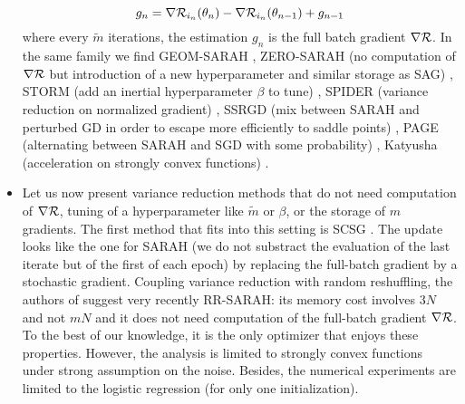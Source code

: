 \begin{itemize}
\begin{equation*}
	g_n = \nabla \mathcal{R}_{i_n}(\theta_n)-\nabla \mathcal{R}_{i_n}(\theta_{n-1})+g_{n-1}
\end{equation*}
where every $\tilde{m}$ iterations, the estimation $g_n$ is the full batch gradient $\nabla \mathcal{R}$. In the same family we find GEOM-SARAH \cite{GEOM_SARAH}, ZERO-SARAH (no computation of $\nabla \mathcal{R}$ but introduction of a new hyperparameter and similar storage as SAG) \cite{ZERO_SARAH}, STORM (add an inertial hyperparameter $\beta$ to tune) \cite{STORM_first}, SPIDER (variance reduction on normalized gradient) \cite{SPIDER_first}, SSRGD (mix between SARAH and perturbed GD in order to escape more efficiently to saddle points) \cite{SSRGD}, PAGE (alternating between SARAH and SGD with some probability) \cite{PAGE}, Katyusha (acceleration on strongly convex functions) \cite{Katyusha}. 
\item Let us now present variance reduction methods that do not need computation of $\nabla \mathcal{R}$, tuning of a hyperparameter like $\tilde{m}$ or $\beta$, or the storage of $m$ gradients. The first method that fits into this setting is SCSG \cite{SCSG}. The update looks like the one for SARAH (we do not substract the evaluation of the last iterate but of the first of each epoch) by replacing the full-batch gradient by a stochastic gradient. Coupling variance reduction with random reshuffling, the authors of \cite{RR_SARAH} suggest very recently RR-SARAH: its memory cost involves $3N$ and not $mN$ and it does not need computation of the full-batch gradient $\nabla \mathcal{R}$. To the best of our knowledge, it is the only optimizer that enjoys these properties. However, the analysis is limited to strongly convex functions under strong assumption on the noise. Besides, the numerical experiments are limited to the logistic regression (for only one initialization). 
\end{itemize}

